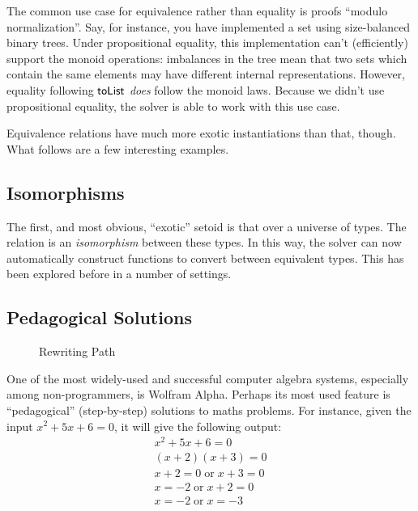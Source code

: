 \documentclass[draft, twocolumn]{article}
\theoremstyle{definition}
\theoremstyle{definition}
\begin{document}
The common use case for equivalence rather than equality is proofs ``modulo
normalization''. Say, for instance, you have implemented a set using
size-balanced binary trees. Under propositional equality, this implementation
can't (efficiently) support the monoid operations: imbalances in the tree mean
that two sets which contain the same elements may have different internal
representations. However, equality following \(\AgdaFunction{toList}\)
\emph{does} follow the monoid laws. Because we didn't use propositional
equality, the solver is able to work with this use case.

Equivalence relations have much more exotic instantiations than that, though.
What follows are a few interesting examples.
\subsection{Isomorphisms}
The first, and most obvious, ``exotic'' setoid is that over a universe of types.
The relation is an \emph{isomorphism} between these types. In this way, the
solver can now automatically construct functions to convert between equivalent
types. This has been explored before in a number of settings.
\subsection{Pedagogical Solutions} 
\begin{figure}[t]
  \centering
  \caption{Rewriting Path}
  \label{rewrite-graph}
\end{figure}
One of the most widely-used and successful computer algebra systems, especially
among non-programmers, is Wolfram
Alpha\cite{wolfram_research_inc._wolframalpha_2019}. Perhaps its most used
feature is ``pedagogical'' (step-by-step) solutions to maths
problems\cite{the_development_team_step-by-step_2009}. For instance, given the
input \(x^2 + 5 x + 6 = 0\), it will give the following output:
\begin{align*}
  x^2 + 5x + 6   = 0 \\
  (x + 2)(x + 3) = 0 \\
  x + 2 = 0   \; \text{or} \; x + 3 = 0 \\
  x     = -2  \; \text{or} \; x + 2 = 0 \\
  x     = -2  \; \text{or} \; x     = -3
\end{align*}
\end{document}
